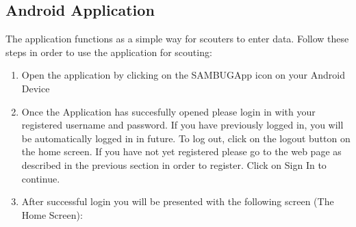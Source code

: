 \documentclass[11pt,a4paper,titlepage]{article}
\begin{document}
\subsection{Android Application}
	The application functions as a simple way for scouters to enter data. Follow these steps in order to use the application for scouting:
	\begin{enumerate}
		\item Open the application by clicking on the SAMBUGApp icon on your Android Device
		\item Once the Application has succesfully opened please login in with your registered username and password. If you have previously logged in, you will be automatically logged in in future. To log out, click on the logout button on the home screen. If you have not yet registered please go to the web page as described in the previous section in order to register. Click on Sign In to continue.
			\begin{center}
			\end{center}
		\item After successful login you will be presented with the following screen (The Home Screen):
			\begin{center}

\end{center}
\end{enumerate}
\end{document}
